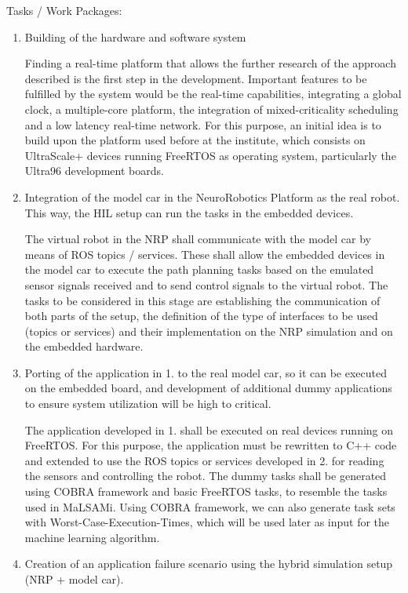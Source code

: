 Tasks / Work Packages:
\begin{enumerate}
\item	Building of the hardware and software system

Finding a real-time platform that allows the further research of the approach described is the first step in the development. Important features to be fulfilled by the system would be the real-time capabilities, integrating a global clock, a multiple-core platform, the integration of mixed-criticality scheduling and a low latency real-time network. For this purpose, an initial idea is to build upon the platform used before at the institute, which consists on UltraScale+ devices running FreeRTOS as operating system, particularly the Ultra96 development boards.

\item	Integration of the model car in the NeuroRobotics Platform as the real robot. This way, the HIL setup can run the tasks in the embedded devices.

The virtual robot in the NRP shall communicate with the model car by means of ROS topics / services. These shall allow the embedded devices in the model car to execute the path planning tasks based on the emulated sensor signals received and to send control signals to the virtual robot. The tasks to be considered in this stage are establishing the communication of both parts of the setup, the definition of the type of interfaces to be used (topics or services) and their implementation on the NRP simulation and on the embedded hardware.

\item	Porting of the application in 1. to the real model car, so it can be executed on the embedded board, and development of additional dummy applications to ensure system utilization will be high to critical.

The application developed in 1. shall be executed on real devices running on FreeRTOS. For this purpose, the application must be rewritten to C++ code and extended to use the ROS topics or services developed in 2. for reading the sensors and controlling the robot. The dummy tasks shall be generated using COBRA framework and basic FreeRTOS tasks, to resemble the tasks used in MaLSAMi. Using COBRA framework, we can also generate task sets with Worst-Case-Execution-Times, which will be used later as input for the machine learning algorithm.

\item	Creation of an application failure scenario using the hybrid simulation setup (NRP + model car).


\end{enumerate}
